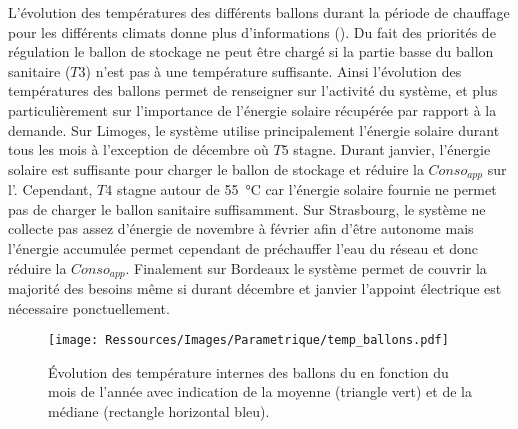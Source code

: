 L’évolution des températures des différents ballons durant la période de chauffage pour
les différents climats donne plus d’informations (). Du
fait des priorités de régulation le ballon de stockage ne peut être chargé si la partie
basse du ballon sanitaire ($T3$) n’est pas à une température suffisante. Ainsi l’évolution
des températures des ballons permet de renseigner sur l’activité du système, et plus
particulièrement sur l’importance de l’énergie solaire récupérée par rapport à la demande.
Sur Limoges, le système utilise principalement l’énergie solaire durant tous les
mois à l’exception de décembre où $T5$ stagne. Durant janvier, l’énergie solaire est
suffisante pour charger le ballon de stockage et réduire la $Conso_{app}$ sur
l’. Cependant, $T4$ stagne autour de \SI{55}{\celsius} car l’énergie solaire fournie
ne permet pas de charger le ballon sanitaire suffisamment. Sur Strasbourg, le système ne
collecte pas assez d’énergie de novembre à février afin d’être autonome mais l’énergie
accumulée permet cependant de préchauffer l’eau du réseau et donc réduire la
$Conso_{app}$. Finalement sur Bordeaux le système permet de couvrir la majorité des besoins
même si durant décembre et janvier l’appoint électrique est nécessaire ponctuellement.

\begin{figure}
    \centering
    \texttt{[image: Ressources/Images/Parametrique/temp\_ballons.pdf]}
    \caption[Évolution des température internes des ballons du ]
            {Évolution des température internes des ballons du  en fonction du mois
             de l’année avec indication de la moyenne (triangle vert) et
             de la médiane (rectangle horizontal bleu).}
    \label{fig:temp_ballon_mensuel}
\end{figure}


